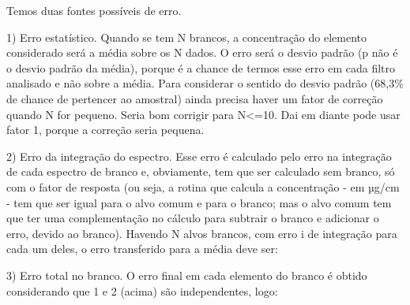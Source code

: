 
Temos duas fontes possíveis de erro.

1) Erro estatístico. Quando se tem N brancos, a concentração do elemento considerado será a média sobre os N dados. O erro será o desvio padrão (p não é o desvio padrão da média), porque é a chance de termos esse erro em cada filtro analisado e não sobre a média. Para considerar o sentido do desvio padrão (68,3\% de chance de pertencer ao amostral) ainda precisa haver um fator de correção quando N for pequeno. Seria bom corrigir para N<=10. Dai em diante pode usar fator 1, porque a correção seria pequena.


2) Erro da integração do espectro. Esse erro é calculado pelo erro na integração de cada espectro de branco e, obviamente, tem que ser calculado sem branco, só com o fator de resposta (ou seja, a rotina que calcula a concentração - em µg/cm - tem que ser igual para o alvo comum e para o branco; mas o alvo comum tem que ter uma complementação no cálculo para subtrair o branco e adicionar o erro, devido ao branco). Havendo N alvos brancos, com erro  i de integração para cada um deles, o erro transferido para a média deve ser:


3) Erro total no branco. O erro final em cada elemento do branco é obtido considerando que 1 e 2 (acima) são independentes, logo:





